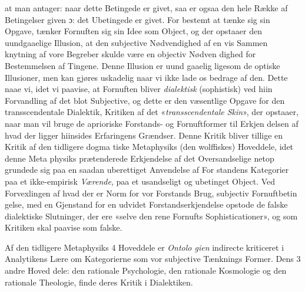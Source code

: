 \documentclass[12pt,a4paper]{book}
\begin{document}
at man antager: naar dette Betingede er givet, saa er ogsaa
den hele Række af Betingelser given ɔ: det Ubetingede er
givet. For bestemt at tænke sig sin Opgave, tænker Fornuften
sig sin Idee som Object, og der opstaaer den uundgaaelige
Illusion, at den subjective Nødvendighed af en vis Sammen\-%
knytning af vore Begreber skulde være en objectiv Nødven\-%
dighed for Bestemmelsen af Tingene. Denne Illusion er uund\-%
gaaelig ligesom de optiske Illusioner, men kan gjøres uskadelig
naar vi ikke lade os bedrage af den. Dette naae vi, idet vi
paavise, at Fornuften bliver \emph{dialektisk} (sophistisk) ved hiin
Forvandling af det blot Subjective, og dette er den væsentlige
Opgave for den transscendentale Dialektik, Kritiken af det
«\emph{transscendentale Skin}», der opstaaer, naar man vil
bruge de aprioriske Forstands- og Fornuftformer til Erkjen\-%
delsen af hvad der ligger hiinsides Erfaringens Grændser.
Denne Kritik bliver tillige en Kritik af den tidligere dogma\-%
tiske Metaphysiks (den wolffiskes) Hoveddele, idet denne Meta\-%
physiks prætenderede Erkjendelse af det Oversandselige netop
grundede sig paa en saadan uberettiget Anvendelse af For\-%
standens Kategorier paa et ikke-empirisk \emph{Værende}, paa et
usandseligt og ubetinget Object. Ved Forvexlingen af hvad
der er Norm for vor Forstands Brug, subjectiv Fornuftbetin\-%
gelse, med en Gjenstand for en udvidet Forstandserkjendelse
opstode de falske dialektiske Slutninger, der ere «selve den
rene Fornufts Sophisticationer», og som Kritiken skal paavise
som falske.

Af den tidligere Metaphysiks 4 Hoveddele er \emph{Ontolo\-%
gien} indirecte kriticeret i Analytikens Lære om Kategorierne
som vor subjective Tænknings Former. Dens 3 andre Hoved\-%
dele: den rationale Psychologie, den rationale Kosmologie og
den rationale Theologie, finde deres Kritik i Dialektiken.
\end{document}
